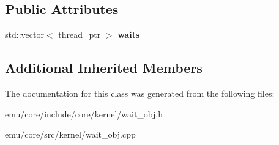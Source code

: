 \subsection*{Public Attributes}
\begin{DoxyCompactItemize}
\item 
\mbox{\label{classeka2l1_1_1kernel_1_1wait__obj_ad9b04bb6662e5b46e58d7b926fc15e12}} 
std\+::vector$<$ thread\+\_\+ptr $>$ {\bfseries waits}
\end{DoxyCompactItemize}
\subsection*{Additional Inherited Members}


The documentation for this class was generated from the following files\+:\begin{DoxyCompactItemize}
\item 
emu/core/include/core/kernel/wait\+\_\+obj.\+h\item 
emu/core/src/kernel/wait\+\_\+obj.\+cpp\end{DoxyCompactItemize}
